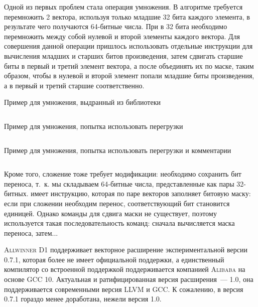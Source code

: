 Одной из первых проблем стала операция умножения.
В алгоритме требуется перемножить 2 вектора, используя только младшие 32 бита каждого элемента, в результате чего получаются 64-битные числа.
При \sew{} в 32 бита необходимо перемножить между собой нулевой и второй элементы каждого вектора.
Для совершения данной операции пришлось использовать отдельные инструкции для вычисления младших и старших битов произведения, затем сдвигать старшие биты в первый и третий элемент вектора, а после объединять их по маске, таким образом, чтобы в нулевой и второй элемент попали младшие биты произведения, а в первый и третий старшие соответственно.
\begin{listing}
	\caption{Пример для умножения, выдранный из библиотеки}
	\inputminted[breaklines, frame=single]{c}{figures/mul_example.c}
\end{listing}
\begin{listing}
	\caption{Пример для умножения, попытка использовать перегрузки}
	\inputminted[breaklines, frame=single]{c}{figures/mul_example1.c}
\end{listing}
\begin{listing}
	\caption{Пример для умножения, попытка использовать перегрузки и комментарии}
	\inputminted[breaklines, frame=single]{c}{figures/mul_example2.c}
\end{listing}

Кроме того, сложение тоже требует модификации: необходимо сохранить бит переноса, т.~к. мы складываем 64-битные числа, представленные как пары 32-битных.
\riscv{} имеет инструкцию, которая по паре векторов заполняет битовую маску: если при сложении необходим перенос, соответствующий бит становится единицей.
Однако команды для сдвига маски не существует, поэтому используется такая последовательность команд: сначала вычисляется маска переноса, затем... %
% 

\textsc{Allwinner D1} поддерживает векторное расширение \riscv{} экспериментальной версии 0.7.1, которая более не имеет официальной поддержки, а единственный компилятор со встроенной поддержкой поддерживается компанией \textsc{Alibaba} на основе \textsc{GCC 10}.
Актуальная и ратифицированная версия расширения~--- 1.0, она поддерживается современными версия \textsc{LLVM} и \textsc{GCC}.
К сожалению, в версия 0.7.1 гораздо менее доработана, нежели версия 1.0.


